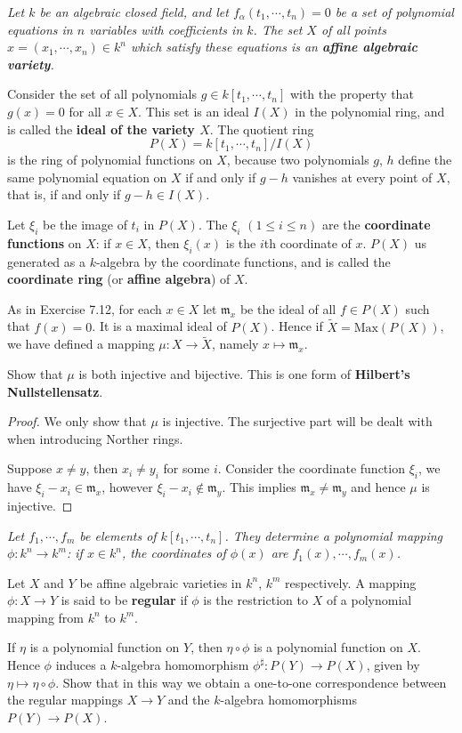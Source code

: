 \begin{problem}\em
Let $k$ be an algebraic closed field, and let $f_\alpha(t_1,\cdots,t_n)=0$ be a set of polynomial equations in $n$ variables with coefficients in $k$. The set $X$ of all points $x=(x_1,\cdots,x_n)\in k^n$ which satisfy these equations is an \textbf{affine algebraic variety}.\par
Consider the set of all polynomials $g\in k[t_1,\cdots,t_n]$ with the property that $g(x)=0$ for all $x\in X$. This set is an ideal $I(X)$ in the polynomial ring, and is called the \textbf{ideal of the variety $X$}. The quotient ring 
$$P(X)=k[t_1,\cdots,t_n]/I(X)$$
is the ring of polynomial functions on $X$, because two polynomials $g$, $h$ define the same polynomial equation on $X$ if and only if $g-h$ vanishes at every point of $X$, that is, if and only if $g-h\in I(X)$.\par
Let $\xi_i$ be the image of $t_i$ in $P(X)$. The $\xi_i$ $(1\le i\le n)$ are the \textbf{coordinate functions} on $X$: if $x\in X$, then $\xi_i(x)$ is the $i$th coordinate of $x$. $P(X)$ us generated as a $k$-algebra by the coordinate functions, and is called the \textbf{coordinate ring} (or \textbf{affine algebra}) of $X$.\par
As in Exercise 7.12, for each $x\in X$ let $\mathfrak{m}_x$ be the ideal of all $f\in P(X)$ such that $f(x)=0$. It is a maximal ideal of $P(X)$. Hence if $\widetilde{X}=\mathrm{Max}(P(X))$, we have defined a mapping $\mu:X\to\widetilde{X}$, namely $x\mapsto\mathfrak{m}_x$.\par
Show that $\mu$ is both injective and bijective. This is one form of \textbf{Hilbert's Nullstellensatz}.
\end{problem}
\begin{proof}
We only show that $\mu$ is injective. The surjective part will be dealt with when introducing Norther rings.\par
Suppose $x\ne y$, then $x_i\ne y_i$ for some $i$. Consider the coordinate function $\xi_i$, we have $\xi_i-x_i\in\mathfrak{m}_x$, however $\xi_i-x_i\notin\mathfrak{m}_y$. This implies $\mathfrak{m}_x\ne\mathfrak{m}_y$ and hence $\mu$ is injective.
\end{proof}
\begin{problem}\em
Let $f_1,\cdots,f_m$ be elements of $k[t_1,\cdots,t_n]$. They determine a polynomial mapping $\phi:k^n\to k^m$: if $x\in k^n$, the coordinates of $\phi(x)$ are $f_1(x),\cdots,f_m(x)$.\par
Let $X$ and $Y$ be affine algebraic varieties in $k^n$, $k^m$ respectively. A mapping $\phi:X\to Y$ is said to be \textbf{regular} if $\phi$ is the restriction to $X$ of a polynomial mapping from $k^n$ to $k^m$.\par
If $\eta$ is a polynomial function on $Y$, then $\eta\circ\phi$ is a polynomial function on $X$. Hence $\phi$ induces a $k$-algebra homomorphism $\phi^\sharp:P(Y)\to P(X)$, given by $\eta\mapsto\eta\circ\phi$. Show that in this way we obtain a one-to-one correspondence between the regular mappings $X\to Y$ and the $k$-algebra homomorphisms $P(Y)\to P(X)$.
\end{problem}
